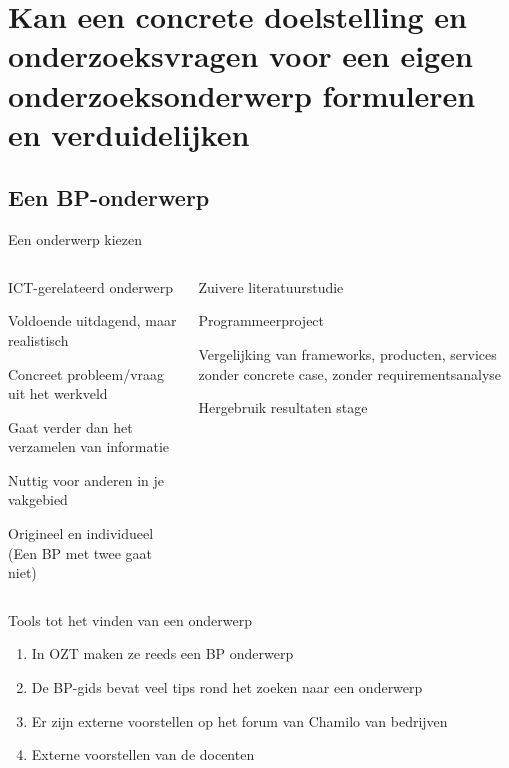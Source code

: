 \section{Kan een concrete doelstelling en onderzoeksvragen voor een eigen onderzoeksonderwerp formuleren en verduidelijken}

\sectionframelogo{}

\subsection{Een BP-onderwerp}
\begin{frame}{Een onderwerp kiezen}
	
	\begin{columns}[c]


		\begin{itemize}
			\item \textcolor{HoGentAccent3}{ICT-gerelateerd onderwerp
			\item Voldoende uitdagend, maar realistisch
			\item Concreet probleem/vraag uit het werkveld
			\item Gaat verder dan het verzamelen van informatie
			\item Nuttig voor anderen in je vakgebied
			\item Origineel en individueel (Een BP met twee gaat niet)}
		\end{itemize}
	
	
	

	\begin{itemize}
		\item \textcolor{HoGentAccent2}{Zuivere literatuurstudie
		\item Programmeerproject
		\item Vergelijking van frameworks, producten, services zonder
		concrete case, zonder requirementsanalyse
		\item  Hergebruik resultaten stage}
	\end{itemize}
		
	\end{columns}	
	
\end{frame}


\begin{frame}{Tools tot het vinden van een onderwerp}
	\begin{enumerate}
		\item In OZT maken ze reeds een BP onderwerp
		\item De BP-gids bevat veel tips rond het zoeken naar een onderwerp
		\item Er zijn externe voorstellen op het forum van Chamilo van bedrijven
		\item \textcolor{HoGentAccent1}{Externe voorstellen van de docenten}
	\end{enumerate}
\end{frame}